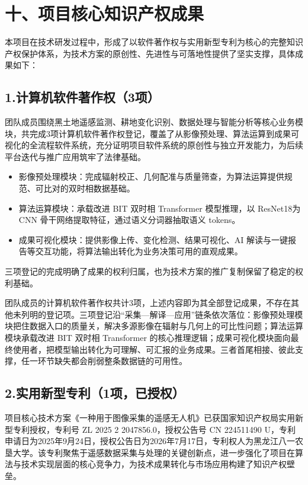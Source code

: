 \section{十、项目核心知识产权成果}

本项目在技术研发过程中，形成了以软件著作权与实用新型专利为核心的完整知识产权保护体系，为技术方案的原创性、先进性与可落地性提供了坚实支撑，具体成果如下：

\subsection{1.计算机软件著作权（3项）}

团队成员围绕黑土地遥感监测、耕地变化识别、数据处理与智能分析等核心业务模块，共完成3项计算机软件著作权登记，覆盖了从影像预处理、算法运算到成果可视化的全流程软件系统，充分证明项目软件系统的原创性与独立开发能力，为后续平台迭代与推广应用筑牢了法律基础。

\begin{itemize}
    \item 影像预处理模块：完成辐射校正、几何配准与质量筛查，为算法运算提供规范、可比对的双时相数据基础。
    \item 算法运算模块：承载改进 BIT 双时相 Transformer 模型推理，以 ResNet18为 CNN 骨干网络提取特征，通过语义分词器抽取语义 tokens。
    \item 成果可视化模块：提供影像上传、变化检测、结果可视化、AI 解读与一键报告等交互功能，将算法输出转化为业务决策可用的直观成果。
\end{itemize}

三项登记的完成明确了成果的权利归属，也为技术方案的推广复制保留了稳定的权利基础。

团队成员的计算机软件著作权共计3项，上述内容即为其全部登记成果，不存在其他未列明的登记项。三项登记沿“采集—解译—应用”链条依次落位：影像预处理模块把住数据入口的质量关，解决多源影像在辐射与几何上的可比性问题；算法运算模块承载改进 BIT 双时相 Transformer 的核心推理逻辑；成果可视化模块面向最终使用者，把模型输出转化为可理解、可汇报的业务成果。三者首尾相接、彼此支撑，任一环节缺失都会削弱整条数据链的可用性。

\subsection{2.实用新型专利（1项，已授权）}

项目核心技术方案《一种用于图像采集的遥感无人机》已获国家知识产权局实用新型专利授权，专利号 ZL 2025 2 2047856.0，授权公告号 CN 224511490 U，专利申请日为2025年9月24日，授权公告日为2026年7月17日，专利权人为黑龙江八一农垦大学。该专利聚焦于遥感数据采集与处理的关键创新点，进一步强化了项目在算法与技术实现层面的核心竞争力，为技术成果转化与市场应用构建了知识产权壁垒。

